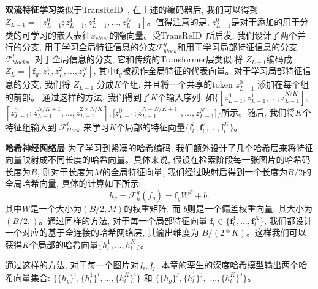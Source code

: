 \textbf{双流特征学习}\quad 类似于TransReID~\cite{he2021transreid}, 在上述的编码器后, 我们可以得到$Z_{L-1} = [z_{L-1}^0;z_{L-1}^1,z_{L-1}^2, ... ,z_{L-1}^N]$。值得注意的是, $z_{L-1}^0$是对于添加的用于分类的可学习的嵌入表征$x_{class}$的隐向量。受TransReID~\cite{he2021transreid}所启发, 我们设计了两个并行的分支, 用于学习全局特征信息的分支$\mathcal{F}^g_{block}$和用于学习局部特征信息的分支 $\mathcal{F}^l_{block}$。对于全局信息的分支, 它和传统的Transformer层类似,将 $Z_{L-1}$编码成$Z_{L} = [\mathbf{f}_g;z_L^1,z_L^2, ... ,z_L^  N]$, 其中$\mathbf{f}_g$被视作全局特征的代表向量。对于学习局部特征信息的分支, 我们将 $Z_{L-1}$ 分成$K$个组, 并且将一个共享的token $z_{L-1}^0$ 添加在每个组的前部。 通过这样的方法, 我们得到了$K$个输入序列, 如$ \{[z_{L-1}^0;z_{L-1}^1,...,z_{L-1}^{N/K}],$ $ [z_{L-1}^0;z_{L-1}^{N/K+1},...,z_{L-1}^{2\times N/K}], [z_{L-1}^0;z_{L-1}^{N-N/K+1}$ $,...,z_{L-1}^N]\}$所示。随后, 我们将$K$个特征组输入到 $\mathcal{F}^l_{block}$ 来学习$K$个局部的特征向量$\{\mathbf{f}_l^1,\mathbf{f}_l^2,...,\mathbf{f}_l^K\}$。\par
\textbf{哈希神经网络层}
为了学习到紧凑的哈希编码, 我们额外设计了几个哈希层来将特征向量映射成不同长度的哈希向量。具体来说, 假设在检索阶段每一张图片的哈希码长度为$B$, 则对于长度为$M$的全局特征向量, 我们经过映射后得到一个长度为$B/2$的全局哈希向量, 具体的计算如下所示:
\begin{equation}
    h_g = \mathcal{F}_h^g(f_g) = \mathbf{f}_g W^T + b.
\end{equation}
其中$W$是一个大小为$(B/2,M)$的权重矩阵, 而 $b$则是一个偏差权重向量, 其大小为$(B/2,)$。通过同样的方法, 对于每一个局部特征向量 $\mathbf{f}_l \in \{\mathbf{f}_l^1,...,\mathbf{f}_l^K\}$, 我们都设计一个对应的基于全连接的哈希网络层, 其输出维度为 $B/(2*K)$。这样我们可以获得$K$个局部的哈希向量$\{h_l^1,...,h_l^K\}$。 \par
通过这样的方法, 对于每一个图片对$\it{I}_i, \it{I}_j$, 本章的孪生的深度哈希模型输出两个哈希向量集合:  $\{\{h_g\}^i,\{h_l^1\}^i,...,\{h_l^K\}^i\}$ 和 $\{\{h_g\}^j,\{h_l^1\}^j,$ $..., \{h_l^K\}^j\}$。
